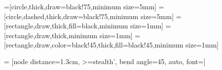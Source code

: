 =[circle,thick,draw=black!75,minimum size=5mm]
=[circle,dashed,thick,draw=black!75,minimum size=5mm]
=[rectangle,draw,thick,fill=black,minimum size=1mm]
=[rectangle,draw,thick,minimum size=1mm]
=[rectangle,draw,color=black!45,thick,fill=black!45,minimum size=1mm]

=
 [node distance=1.3cm, >=stealth', bend angle=45, auto,
  font=\fontsize{8}{8}\selectfont]

\newcommand{\eg}{\emph{e.g.,}\xspace}
\newcommand{\ie}{\emph{i.e.,}\xspace}
\newcommand{\cf}{\emph{cf.}\xspace}

\newcommand{\ctx}[1]{\texttt{\textsc{#1}}}

\newcommand{\enabled}[2]{$#1[#2\rangle$}
\newcommand{\flik}{\textsc{Flik}\xspace}



\newcommand{\authorcomment}[3][comment]
  {\ifdraft{\noindent
      \fbox{\footnotesize\textcolor{author}{\textsc{#2}}}
      \textcolor{#1}{\textsl{#3}}}{}}



\let\orig@figure\figure
\renewcommand*{\figure}[1][]{\orig@figure[#1]\vspace{-1ex}} %
\let\orig@endfigure\endfigure
\renewcommand*{\endfigure}{\vspace{-1.5ex}\orig@endfigure} %

\let\orig@endlstlisting\endlstlisting
\renewcommand*{\endlstlisting}{\vspace{-3ex}\orig@endlstlisting} %

\usepackage{caption}
\captionsetup[figure]{aboveskip=0.0em,belowskip=-0em}
\captionsetup[table]{aboveskip=0em,belowskip=-0em}



\makeatother